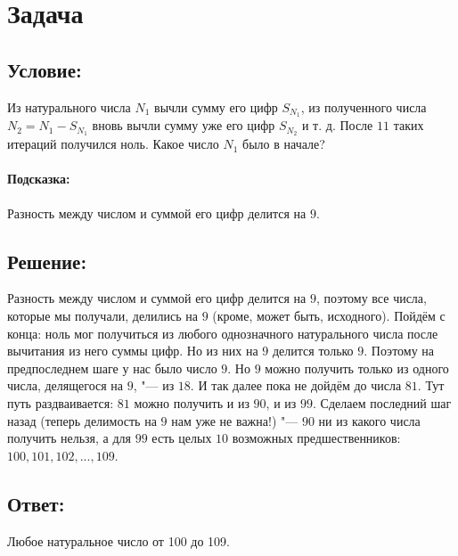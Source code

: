 \section{Задача}

\subsection*{Условие:}
Из натурального числа $N_1$ вычли сумму его цифр $S_{N_1}$, из полученного числа
$N_2 = N_1 - S_{N_1}$ вновь вычли сумму уже его цифр $S_{N_2}$ и т. д. После $11$ таких итераций
получился ноль. Какое число $N_1$ было в начале?

\paragraph*{Подсказка:}
Разность между числом и суммой его цифр делится на $9$.

\subsection*{Решение:}
Разность между числом и суммой его цифр делится на $9$, поэтому все числа, которые мы получали, 
делились на $9$ (кроме, может быть, исходного). Пойдём с конца: ноль мог получиться из любого 
однозначного натурального числа после вычитания из него суммы цифр. Но из них на $9$ делится только 
$9$. Поэтому на предпоследнем шаге у нас было число $9$. Но $9$ можно получить только из одного
числа, делящегося на $9$, "--- из $18$. И так далее пока не дойдём до числа $81$. Тут путь 
раздваивается: $81$ можно получить и из $90$, и из $99$. Сделаем последний шаг назад (теперь
делимость на $9$ нам уже не важна!) "--- $90$ ни из какого числа получить нельзя, а для $99$ есть
целых $10$ возможных предшественников: $100, 101, 102, ..., 109$.

\subsection*{Ответ:}
Любое натуральное число от 100 до 109.